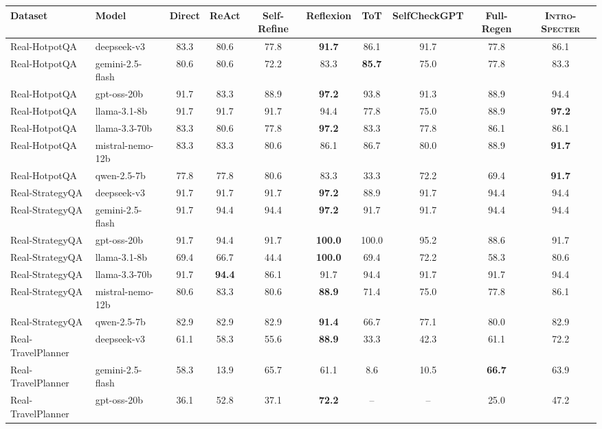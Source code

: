 \begin{tabular}{llcccccccc}
\toprule
Dataset & Model & Direct & ReAct & Self-Refine & Reflexion & ToT & SelfCheckGPT & Full-Regen & \textsc{Intro-Specter} \\
\midrule
Real-HotpotQA & deepseek-v3 & 83.3 & 80.6 & 77.8 & \textbf{91.7} & 86.1 & 91.7 & 77.8 & 86.1 \\
Real-HotpotQA & gemini-2.5-flash & 80.6 & 80.6 & 72.2 & 83.3 & \textbf{85.7} & 75.0 & 77.8 & 83.3 \\
Real-HotpotQA & gpt-oss-20b & 91.7 & 83.3 & 88.9 & \textbf{97.2} & 93.8 & 91.3 & 88.9 & 94.4 \\
Real-HotpotQA & llama-3.1-8b & 91.7 & 91.7 & 91.7 & 94.4 & 77.8 & 75.0 & 88.9 & \textbf{97.2} \\
Real-HotpotQA & llama-3.3-70b & 83.3 & 80.6 & 77.8 & \textbf{97.2} & 83.3 & 77.8 & 86.1 & 86.1 \\
Real-HotpotQA & mistral-nemo-12b & 83.3 & 83.3 & 80.6 & 86.1 & 86.7 & 80.0 & 88.9 & \textbf{91.7} \\
Real-HotpotQA & qwen-2.5-7b & 77.8 & 77.8 & 80.6 & 83.3 & 33.3 & 72.2 & 69.4 & \textbf{91.7} \\
\midrule
Real-StrategyQA & deepseek-v3 & 91.7 & 91.7 & 91.7 & \textbf{97.2} & 88.9 & 91.7 & 94.4 & 94.4 \\
Real-StrategyQA & gemini-2.5-flash & 91.7 & 94.4 & 94.4 & \textbf{97.2} & 91.7 & 91.7 & 94.4 & 94.4 \\
Real-StrategyQA & gpt-oss-20b & 91.7 & 94.4 & 91.7 & \textbf{100.0} & 100.0 & 95.2 & 88.6 & 91.7 \\
Real-StrategyQA & llama-3.1-8b & 69.4 & 66.7 & 44.4 & \textbf{100.0} & 69.4 & 72.2 & 58.3 & 80.6 \\
Real-StrategyQA & llama-3.3-70b & 91.7 & \textbf{94.4} & 86.1 & 91.7 & 94.4 & 91.7 & 91.7 & 94.4 \\
Real-StrategyQA & mistral-nemo-12b & 80.6 & 83.3 & 80.6 & \textbf{88.9} & 71.4 & 75.0 & 77.8 & 86.1 \\
Real-StrategyQA & qwen-2.5-7b & 82.9 & 82.9 & 82.9 & \textbf{91.4} & 66.7 & 77.1 & 80.0 & 82.9 \\
\midrule
Real-TravelPlanner & deepseek-v3 & 61.1 & 58.3 & 55.6 & \textbf{88.9} & 33.3 & 42.3 & 61.1 & 72.2 \\
Real-TravelPlanner & gemini-2.5-flash & 58.3 & 13.9 & 65.7 & 61.1 & 8.6 & 10.5 & \textbf{66.7} & 63.9 \\
Real-TravelPlanner & gpt-oss-20b & 36.1 & 52.8 & 37.1 & \textbf{72.2} & -- & -- & 25.0 & 47.2 \\

\end{tabular}
